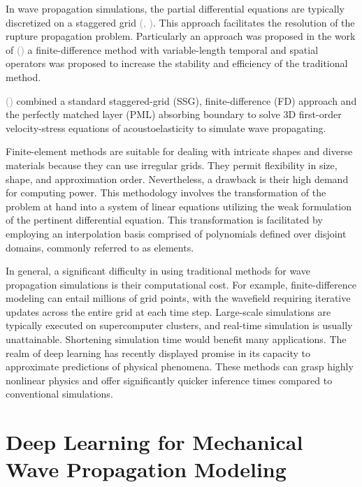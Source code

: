 \documentclass{tufte-handout}
\renewcommand{\citep}[2][]{\textcolor{gray}{(\citeauthor{#2}, \citeyear[#1]{#2})}}
\renewcommand{\citeauthoryear}[2][]{\textcolor{gray}{\citeauthor{#2} (\textcolor{gray}{\citeyear[#1]{#2}})}}
\begin{document}
In wave propagation simulations, the partial differential equations are typically discretized on a staggered grid \citep{Virieux1986}. This approach facilitates the resolution of the rupture propagation problem. Particularly an approach was proposed in the work of \citeauthoryear{Zhou2021} a finite-difference method with variable-length temporal and spatial operators was proposed to increase the stability and efficiency of the traditional method.

\citeauthoryear{liu_simulation_2023} combined a standard staggered-grid (SSG), finite-difference (FD) approach and the perfectly matched layer (PML) absorbing boundary to solve 3D first-order velocity-stress equations of acoustoelasticity to simulate wave propagating.

Finite-element methods are suitable for dealing with intricate shapes and diverse materials because they can use irregular grids. They permit flexibility in size, shape, and approximation order. Nevertheless, a drawback is their high demand for computing power. This methodology involves the transformation of the problem at hand into a system of linear equations utilizing the weak formulation of the pertinent differential equation. This transformation is facilitated by employing an interpolation basis comprised of polynomials defined over disjoint domains, commonly referred to as elements.

In general, a significant difficulty in using traditional methods for wave propagation simulations is their computational cost. For example, finite-difference modeling can entail millions of grid points, with the wavefield requiring iterative updates across the entire grid at each time step. Large-scale simulations are typically executed on supercomputer clusters, and real-time simulation is usually unattainable. Shortening simulation time would benefit many applications. The realm of deep learning has recently displayed promise in its capacity to approximate predictions of physical phenomena. These methods can grasp highly nonlinear physics and offer significantly quicker inference times compared to conventional simulations.


\section{Deep Learning for Mechanical Wave Propagation Modeling}\label{sec:dl_mwpm}
\end{document}
